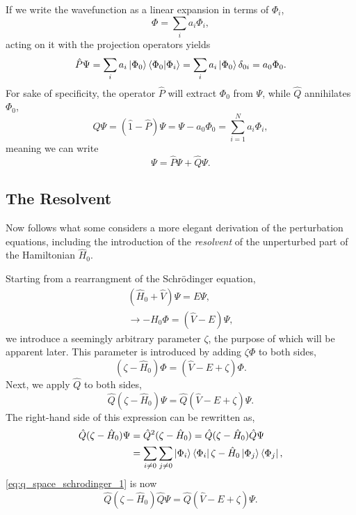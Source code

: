 If we write the wavefunction as a linear expansion in terms of $\Phi_i$,
\begin{equation}
    \Phi = \sum_i a_i \Phi_i,
\end{equation}
acting on it with the projection operators yields
\begin{equation}
    \hat{P} \Psi = \sum_i a_i \ket{\Phi_0}\bra{\Phi_0}\ket{\Phi_i}
        = \sum_i a_i\ket{\Phi_0}\delta_{0i} = a_0\Phi_0.
\end{equation}
For sake of specificity, the operator $\hat{P}$ will extract $\Phi_0$ from 
$\Psi$, while $\hat{Q}$ annihilates $\Phi_0$,
\begin{equation}
    \hat{Q}\Psi = (\hat{1} - \hat{P})\Psi = \Psi - a_0\Phi_0 
        = \sum_{i=1}^N a_i\Phi_i,
\end{equation}
meaning we can write
\begin{equation}
    \Psi = \hat{P} \Psi + \hat{Q} \Psi.
\end{equation}

\subsection{The Resolvent}
Now follows what some considers a more elegant derivation of the perturbation equations,
including the introduction of the \emph{resolvent} of the unperturbed part of the Hamiltonian
$\hat{H}_0$.

Starting from a rearrangment of the Schrödinger equation,
\begin{equation}
    \begin{gathered}
        (\hat{H}_0 + \hat{V})\Psi = E\Psi, \\
        \to -\hat{H}_0 \Phi = (\hat{V} - E)\Psi,
    \end{gathered}
\end{equation}
we introduce a seemingly arbitrary parameter $\zeta$, the purpose of which will be 
apparent later. This parameter is introduced by adding $\zeta\Phi$ to both sides,
\begin{equation}
    (\zeta - \hat{H}_0)\Phi = (\hat{V} - E + \zeta)\Phi.
\end{equation}
Next, we apply $\hat{Q}$ to both sides,
\begin{equation}
    \label{eq:q_space_schrodinger_1} 
    \hat{Q}(\zeta - \hat{H}_0)\Psi = \hat{Q}(\hat{V} - E + \zeta)\Psi.
\end{equation}
The right-hand side of this expression can be rewritten as,
\begin{equation}
    \begin{aligned}
    \hat{Q}(\zeta - \hat{H}_0)\Psi &= \hat{Q}^2(\zeta - \hat{H}_0)
        = \hat{Q}(\zeta - \hat{H}_0)\hat{Q}\Psi \\
        &= \sum_{i \neq 0} \sum_{j \neq 0} \ket{\Phi_i} \bra{\Phi_i}
            \zeta - \hat{H}_0 \ket{\Phi_j} \bra{\Phi_j},
    \end{aligned}
\end{equation}
\autoref{eq:q_space_schrodinger_1} is now 
\begin{equation}
    \label{eq:q_space_schrodinger_2}
    \hat{Q}(\zeta - \hat{H}_0)\hat{Q}\Psi = \hat{Q}(\hat{V} - E + \zeta)\Psi.
\end{equation}


